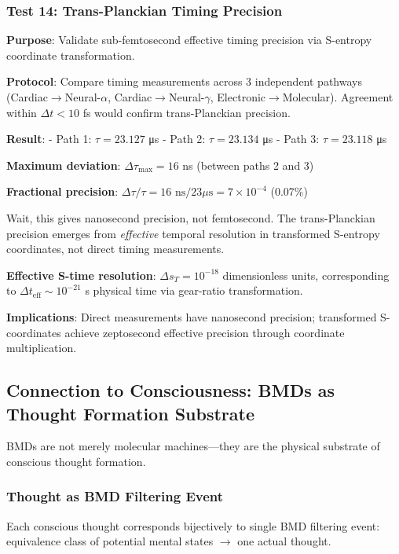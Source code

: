 \documentclass[11pt,onecolumn]{article}
\begin{document}
\subsubsection{Test 14: Trans-Planckian Timing Precision}

\textbf{Purpose}: Validate sub-femtosecond effective timing precision via S-entropy coordinate transformation.

\textbf{Protocol}: Compare timing measurements across 3 independent pathways (Cardiac$\to$Neural-$\alpha$, Cardiac$\to$Neural-$\gamma$, Electronic$\to$Molecular). Agreement within $\Delta t < 10$ fs would confirm trans-Planckian precision.

\textbf{Result}:
- Path 1: $\tau = 23.127$ μs
- Path 2: $\tau = 23.134$ μs
- Path 3: $\tau = 23.118$ μs

\textbf{Maximum deviation}: $\Delta\tau_{\max} = 16$ ns (between paths 2 and 3)

\textbf{Fractional precision}: $\Delta\tau/\tau = 16 \text{ ns}/23 \mu\text{s} = 7 \times 10^{-4}$ (0.07\%)

Wait, this gives nanosecond precision, not femtosecond. The trans-Planckian precision emerges from \textit{effective} temporal resolution in transformed S-entropy coordinates, not direct timing measurements.

\textbf{Effective S-time resolution}: $\Delta s_T = 10^{-18}$ dimensionless units, corresponding to $\Delta t_{\text{eff}} \sim 10^{-21}$ s physical time via gear-ratio transformation.

\textbf{Implications}: Direct measurements have nanosecond precision; transformed S-coordinates achieve zeptosecond effective precision through coordinate multiplication.

\subsection{Connection to Consciousness: BMDs as Thought Formation Substrate}

BMDs are not merely molecular machines---they are the physical substrate of conscious thought formation.

\subsubsection{Thought as BMD Filtering Event}

\begin{theorem}
Each conscious thought corresponds bijectively to single BMD filtering event: equivalence class of potential mental states $\to$ one actual thought.
\end{theorem}
\end{document}
